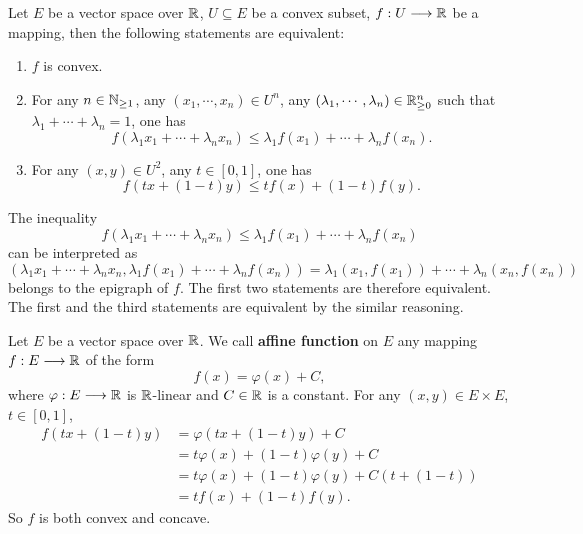 \begin{theoremenv}
    Let $E$ be a vector space over $\mathbb{R}$, $U \subseteq E$ be a convex subset,
    $f : U \longrightarrow \mathbb{R}$ be a mapping, then the following statements are equivalent:
    \begin{enumerate}[label=(\arabic*)]
        \item $f$ is convex.
        \item For any $n \in \mathbb{N}_{\ge 1}$, any $(x_1,\cdots,x_n) \in U^n$, any $(\lambda_1,\cdots,\lambda_n) \in \mathbb{R}_{\ge 0}^n$ such that $\lambda_1 + \cdots + \lambda_n = 1$, one has
            $$f(\lambda_1 x_1 + \cdots + \lambda_n x_n) \le \lambda_1 f(x_1) + \cdots + \lambda_n f(x_n).$$
        \item  For any $(x,y) \in U^2$, any $t \in [0,1]$, one has
            $$f(tx + (1-t)y) \le t f(x) + (1-t)f(y).$$
    \end{enumerate}
\end{theoremenv}
\begin{proofenv}
    The inequality
    $$f(\lambda_1 x_1 + \cdots + \lambda_n x_n) \le \lambda_1 f(x_1) + \cdots + \lambda_n f(x_n)$$
    can be interpreted as
    $$(\lambda_1 x_1 + \cdots + \lambda_n x_n, \lambda_1 f(x_1) + \cdots + \lambda_n f(x_n)) = \lambda_1 (x_1,f(x_1)) + \cdots + \lambda_n (x_n,f(x_n))$$
    belongs to the epigraph of $f$.
    The first two statements are therefore equivalent.
    The first and the third statements are equivalent by the similar reasoning.
\end{proofenv}

\begin{definitionenv}
    Let $E$ be a vector space over $\mathbb{R}$.
    We call \textbf{affine function} on $E$ any mapping $f : E \longrightarrow \mathbb{R}$ of the form
    $$f(x) = \varphi(x) + C,$$
    where $\varphi : E \longrightarrow \mathbb{R}$ is $\mathbb{R}$-linear and $C \in \mathbb{R}$ is a constant.
    For any $(x,y) \in E \times E$, $t \in [0,1]$,
    $$\begin{aligned}
        f(tx + (1 - t)y)
        &= \varphi (tx + (1 - t)y) + C\\
        &= t \varphi(x) + (1 - t)\varphi(y) + C\\
        &= t \varphi(x) + (1 - t)\varphi(y) + C(t + (1 - t))\\
        &= t f(x) + (1 - t) f(y).
    \end{aligned}$$
    So $f$ is both convex and concave.
\end{definitionenv}


